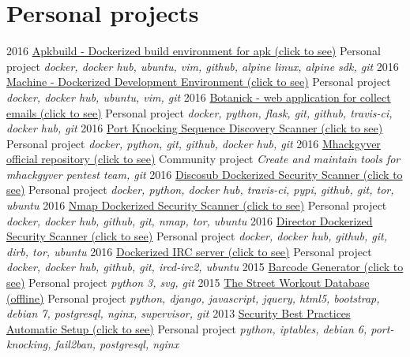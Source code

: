 \documentclass[]{friggeri-cv}
\begin{document}
\section{Personal projects}
\begin{entrylist}
  \entry
    {2016}
    {\href{https://github.com/gr0und-s3ct0r/apkbuild}{Apkbuild - Dockerized build environment for apk (click to see)}}
    {Personal project}
    {\emph{docker, docker hub, ubuntu, vim, github, alpine linux, alpine sdk, git}}
  \entry
    {2016}
    {\href{https://github.com/4383/machine}{Machine - Dockerized Development Environment (click to see)}}
    {Personal project}
    {\emph{docker, docker hub, ubuntu, vim, git}}
  \entry
    {2016}
    {\href{https://github.com/4383/Botanick}{Botanick - web application for collect emails (click to see)}}
    {Personal project}
    {\emph{docker, python, flask, git, github, travis-ci, docker hub, git}}
  \entry
    {2016}
    {\href{https://github.com/mhackgyver-squad/porno-king}{Port Knocking Sequence Discovery Scanner (click to see)}}
    {Personal project}
    {\emph{docker, python, git, github, docker hub, git}}
  \entry
    {2016}
    {\href{https://github.com/mhackgyver-squad/mhackgyver}{Mhackgyver official repository (click to see)}}
    {Community project}
    {\emph{Create and maintain tools for mhackgyver pentest team, git}}
  \entry
    {2016}
    {\href{https://hub.docker.com/r/4383/discosub}{Discosub Dockerized Security Scanner (click to see)}}
    {Personal project}
    {\emph{docker, python, docker hub, travis-ci, pypi, github, git, tor, ubuntu}}
  \entry
    {2016}
    {\href{https://hub.docker.com/r/4383/system-service-footprint}{Nmap Dockerized Security Scanner (click to see)}}
    {Personal project}
    {\emph{docker, docker hub, github, git, nmap, tor, ubuntu}}
  \entry
    {2016}
    {\href{https://hub.docker.com/r/4383/director}{Director Dockerized Security Scanner (click to see)}}
    {Personal project}
    {\emph{docker, docker hub, github, git, dirb, tor, ubuntu}}
  \entry
    {2016}
    {\href{https://hub.docker.com/r/4383/irc-server}{Dockerized IRC server (click to see)}}
    {Personal project}
    {\emph{docker, docker hub, github, git, ircd-irc2, ubuntu}}
  \entry
    {2015}
    {\href{http://pypi.python.org/pypi/barcode-generator/0.1rc15}{Barcode Generator (click to see)}}
    {Personal project}
    {\emph{python 3, svg, git}}
  \entry
    {2015}
    {\href{https://github.com/4383/street-workout-database}{The Street Workout Database (offline)}}
    {Personal project}
    {\emph{python, django, javascript, jquery, html5, bootstrap, debian 7, postgresql, nginx, supervisor, git}}
  \entry
    {2013}
    {\href{https://github.com/4383/fabric-debian/}{Security Best Practices Automatic Setup (click to see)}}
    {Personal project}
    {\emph{python, iptables,  debian 6, port-knocking, fail2ban, postgresql, nginx}}
\end{entrylist}
\end{document}
